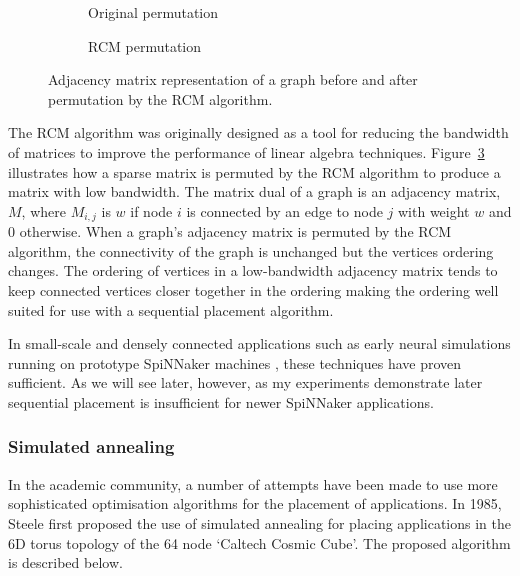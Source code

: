 				\begin{figure}
					\center
					\begin{subfigure}{0.45\linewidth}
						\center
						
						\caption{Original permutation}
						\label{fig:rcm-initial}
					\end{subfigure}
					\begin{subfigure}{0.45\linewidth}
						\center
						
						\caption{RCM permutation}
						\label{fig:rcm-sorted}
					\end{subfigure}
					
					\caption{Adjacency matrix representation of a graph before and after
					permutation by the RCM algorithm.}
					\label{fig:rcm}
				\end{figure}
				
				The RCM algorithm was originally designed as a tool for reducing the
				bandwidth of matrices to improve the performance of linear algebra
				techniques. Figure~\ref{fig:rcm} illustrates how a sparse matrix is
				permuted by the RCM algorithm to produce a matrix with low bandwidth.
				The matrix dual of a graph is an adjacency matrix, $M$, where $M_{i,j}$
				is $w$ if node $i$ is connected by an edge to node $j$ with weight $w$
				and 0 otherwise. When a graph's adjacency matrix is permuted by the RCM
				algorithm, the connectivity of the graph is unchanged but the vertices
				ordering changes. The ordering of vertices in a low-bandwidth adjacency
				matrix tends to keep connected vertices closer together in the ordering
				making the ordering well suited for use with a sequential placement
				algorithm.
				
				In small-scale and densely connected applications such as early neural
				simulations running on prototype SpiNNaker machines \cite{galluppi10},
				these techniques have proven sufficient. As we will see later, however,
				as my experiments demonstrate later sequential placement is
				insufficient for newer SpiNNaker applications.
				
			\subsubsection{Simulated annealing}
				
				\label{sec:application-placement-summary}
				
				In the academic community, a number of attempts have been made to use
				more sophisticated optimisation algorithms for the placement of
				applications. In 1985, Steele \cite{steele85} first proposed the use of
				simulated annealing for placing applications in the 6D torus topology
				of the 64 node `Caltech Cosmic Cube'. The proposed algorithm is
				described below.
				
